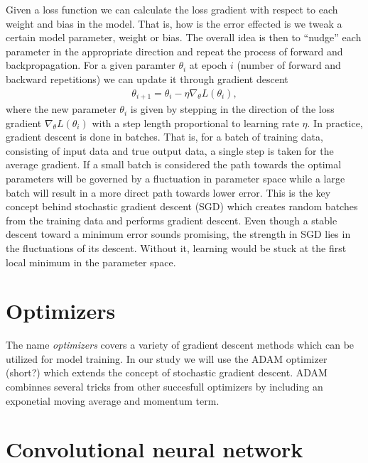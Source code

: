 Given a loss function we can calculate the loss gradient with respect to each weight and bias in the model. That is, how is the error effected is we tweak a certain model parameter, weight or bias. The overall idea is then to  ``nudge'' each parameter in the appropriate direction and repeat the process of forward and backpropagation. For a given paramter $\theta_i$ at epoch $i$ (number of forward and backward repetitions) we can update it through gradient descent 
\begin{align*}
  \theta_{i+1} = \theta_i - \eta \nabla_\theta L(\theta_i),
\end{align*}
where the new parameter $\theta_i$ is given by stepping in the direction of the loss gradient $\nabla_\theta L(\theta_i)$ with a step length proportional to learning rate $\eta$. In practice, gradient descent is done in batches. That is, for a batch of training data, consisting of input data and true output data, a single step is taken for the average gradient. If a small batch is considered the path towards the optimal parameters will be governed by a fluctuation in parameter space while a large batch will result in a more direct path towards lower error. This is the key concept behind stochastic gradient descent (SGD) which creates random batches from the training data and performs gradient descent. Even though a stable descent toward a minimum error sounds promising, the strength in \acrshort{SGD} lies in the fluctuations of its descent. Without it, learning would be stuck at the first local minimum in the parameter space. 


\section{Optimizers}
The name \textit{optimizers} covers a variety of gradient descent methods which can be utilized for model training. In our study we will use the ADAM optimizer (short?) which extends the concept of stochastic gradient descent. ADAM combinnes several tricks from other succesfull optimizers by including an exponetial moving average and momentum term. 






\section{Convolutional neural network}


